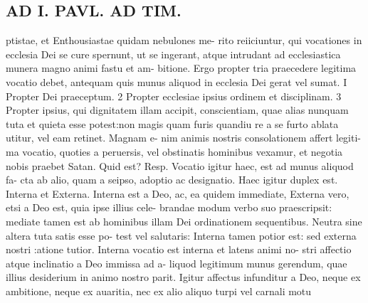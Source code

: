 \documentclass{article}
\begin{document}
\begin{pages}
\section*{AD I. PAVL. AD TIM. }
\marginpar{[ p.3*f. ]}ptistae, et Enthousiastae quidam nebulones me- rito reiiciuntur, qui vocationes in ecclesia Dei se cure spernunt, ut se ingerant, atque intrudant ad ecclesiastica munera magno animi fastu et am- bitione. Ergo propter tria praecedere legitima vocatio debet, antequam quis munus aliquod in ecclesia Dei gerat vel sumat. I Propter Dei praeceptum. 2 Propter ecclesiae ipsius ordinem et disciplinam. 3 Propter ipsius, qui dignitatem illam accipit, conscientiam, quae alias nunquam tuta et quieta esse potest:non magis quam furis quandiu re a se furto ablata utitur, vel eam retinet. Magnam e- nim animis nostris consolationem affert legiti- ma vocatio, quoties a peruersis, vel obstinatis hominibus vexamur, et negotia nobis praebet Satan. Quid est? Resp. Vocatio igitur haec, est ad munus aliquod fa- cta ab alio, quam a seipso, adoptio ac designatio. Haec igitur duplex est. Interna et Externa. Interna est a Deo, ac, ea quidem immediate, Externa vero, etsi a Deo est, quia ipse illius cele- brandae modum verbo suo praescripsit: mediate tamen est ab hominibus illam Dei ordinationem sequentibus. Neutra sine altera tuta satis esse po- test vel salutaris: Interna tamen potior est: sed externa nostri :atione tutior. Interna vocatio est interna et latens animi no- stri affectio atque inclinatio a Deo immissa ad a- liquod legitimum munus gerendum, quae illius desiderium in animo nostro parit. Igitur affectus infunditur a Deo, neque ex ambitione, neque ex auaritia, nec ex alio aliquo turpi vel carnali motu 

\end{pages}
\end{document}

